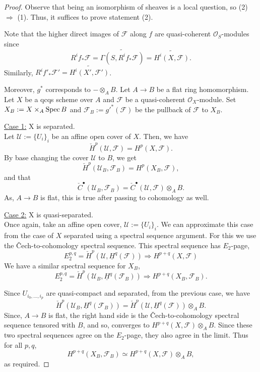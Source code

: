 \documentclass[11pt]{amsart}
\newcommand{\Spec}{{\rm Spec \,}}
\renewcommand{\tilde}{\widetilde}
\newcommand{\sF}{{\mathcal F}}
\newcommand{\sO}{{\mathcal O}}
\newcommand{\sU}{{\mathcal U}}
\theoremstyle{definition}
\begin{document}
\begin{proof}
	Observe that being an isomorphism of sheaves is a local question, so (2) $\Rightarrow$ (1). Thus, it suffices to prove statement (2).
	
	Note that the higher direct images of $\sF$ along $f$ are quasi-coherent $\sO_S$-modules since  \[R^if_*\sF=\tilde{\Gamma (S,R^if_*\sF)}=\tilde{H^i(X,\sF)}.\]
	Similarly, $R^if'_*\sF'= \tilde{H^i(X',\sF')}$.
	
	Moreover, $g^*$ corresponds to $-\otimes_A B$. Let $A\rightarrow B$ be a flat ring homomorphism. Let $X$ be a qcqs scheme over $A$ and $\sF$ be a quasi-coherent $\sO_X$-module. Set $X_B:= X\times_A \Spec B$ and $\sF_B:= g'^*(\sF)$ be the pullback of $\sF$ to $X_B$.
	
	\noindent\underline{Case 1:} X is separated.\\
	Let $\sU:=\{U_i\}_i$ be an affine open cover of $X$. Then, we have
	\[ \check{H}^p(\sU,\sF)=H^p(X,\sF).\]
	By base changing the cover $\sU$ to $B$, we get
	\[\check{H}^p(\sU_B,\sF_B)=H^p(X_B,\sF),\]
	and that
	\[\check{C}^{\bullet}(\sU_B,\sF_B)=\check{C}^{\bullet}(\sU,\sF)\otimes_A B.\]
	As, $A\rightarrow B$ is flat, this is true after passing to cohomology as well.
	
	\noindent\underline{Case 2:} X is quasi-separated.\\
	Once again, take an affine open cover, $\sU:=\{U_i\}_i$. We can approximate this case from the case of $X$ separated using a spectral sequence argument. For this we use the \v{C}ech-to-cohomology spectral sequence. This spectral sequence has $E_2$-page,
	\[E^{p,q}_2=\check{H}^p(\sU,\underline{H}^q(\sF))\Rightarrow H^{p+q}(X,\sF)\]
	We have a similar spectral sequence for $X_B$,
	\[E^{p,q}_2=\check{H}^p(\sU_B,\underline{H}^q(\sF_B))\Rightarrow H^{p+q}(X_B,\sF_B).\]
	
	Since $U_{i_0,\ldots,i_p}$ are quasi-compact and separated, from the previous case, we have
	\[\check{H}^p(\sU_B,\underline{H}^q(\sF_B))=\check{H}^p(\sU,\underline{H}^q(\sF)) \otimes_A B.\]
	Since, $A\rightarrow B$ is flat, the right hand side is the \v{C}ech-to-cohomology spectral sequence tensored with $B$, and so, converges to $H^{p+q}(X,\sF)\otimes_A B$. Since these two spectral sequences agree on the $E_2$-page, they also agree in the limit. Thus for all $p,q$,
	\[H^{p+q}(X_B,\sF_B) \simeq H^{p+q}(X,\sF)\otimes_A B,\]
	as required.
\end{proof}
\end{document}
